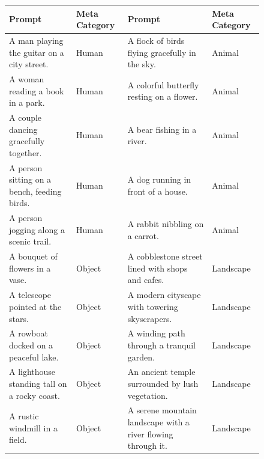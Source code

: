 \begin{figure}[!h]
    \centering
    \label{tab:supp_text_prompt_img}
    \vspace{-2.4em}
    \renewcommand{\arraystretch}{1.3}
    \small
    \vspace{1.5em}
    \begin{tabular}{>{\centering\arraybackslash}p{5.5cm}>{\centering\arraybackslash}p{1.9cm}|>{\centering\arraybackslash}p{6.3cm}>{\centering\arraybackslash}p{1.9cm}} 
        \hline
        Prompt & Meta Category & Prompt & Meta Category \\
        \hline
        A man playing the guitar on a city street. & Human & A flock of birds flying gracefully in the sky. &  Animal \\
        A woman reading a book in a park. & Human & A colorful butterfly resting on a flower. &  Animal \\
        A couple dancing gracefully together. & Human & A bear fishing in a river. &  Animal \\
        A person sitting on a bench, feeding birds. & Human & A dog running in front of a house. &  Animal \\
        A person jogging along a scenic trail. & Human & A rabbit nibbling on a carrot. &  Animal \\
        A bouquet of flowers in a vase. & Object & A cobblestone street lined with shops and cafes. &  Landscape \\
        A telescope pointed at the stars. & Object & A modern cityscape with towering skyscrapers. &  Landscape \\
        A rowboat docked on a peaceful lake. & Object & A winding path through a tranquil garden. &  Landscape \\
        A lighthouse standing tall on a rocky coast. & Object & An ancient temple surrounded by lush vegetation. &  Landscape \\
        A rustic windmill in a field. & Object & A serene mountain landscape with a river flowing through it. &  Landscape \\
        \hline
    \end{tabular}


\end{figure}
